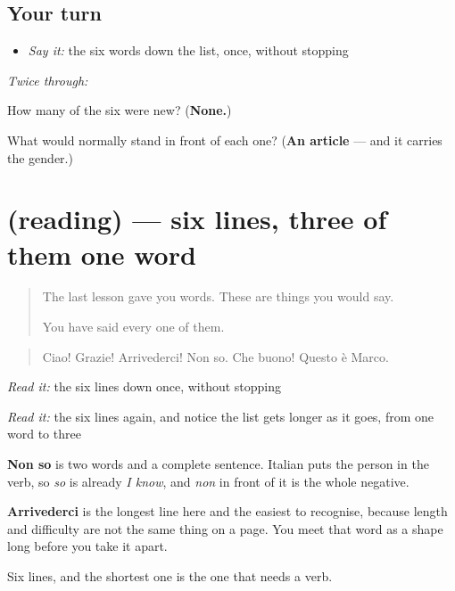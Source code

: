 \subsection*{Your turn}
\begin{itemize}
\raggedright
  \item \emph{Say it:} the six words down the list, once, without stopping
\end{itemize}

\emph{Twice through:}

\begin{tcolorbox}[breakable,colback=teal!4,colframe=teal!35!black,title={Before you move on}]
How many of the six were new? (\textbf{None.})

What would normally stand in front of each one? (\textbf{An article} — and it carries the gender.)
\end{tcolorbox}
\section[(reading)]{(reading) — six lines, three of them one word}

\label{lesson:IT-C36-frasi}



\begin{quote}
The last lesson gave you words. These are things you would say.

You have said every one of them.
\end{quote}

\begin{tcolorbox}[breakable,skin=enhanced,colback=orange!6,colframe=orange!45!black,boxrule=0.5pt,arc=1mm,left=6pt,right=6pt,top=4pt,bottom=4pt,fonttitle=\bfseries,title={Read this}]
\begin{quote}
Ciao! Grazie! Arrivederci! Non so. Che buono! Questo è Marco.
\end{quote}

\emph{Read it:} the six lines down once, without stopping

\emph{Read it:} the six lines again, and notice the list gets longer as it goes, from one word to three
\end{tcolorbox}

\begin{culture}
\textbf{Non so} is two words and a complete sentence. Italian puts the person in the verb, so \emph{so} is already \emph{I know}, and \emph{non} in front of it is the whole negative.

\textbf{Arrivederci} is the longest line here and the easiest to recognise, because length and difficulty are not the same thing on a page. You meet that word as a shape long before you take it apart.

Six lines, and the shortest one is the one that needs a verb.
\end{culture}

